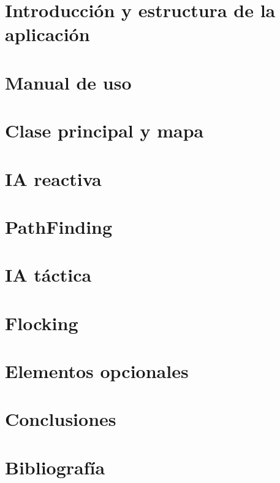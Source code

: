 \documentclass[a4paper,10pt]{article}
\begin{document}
\newpage
\part{Introducción y estructura de la aplicación}





\newpage
\part{Manual de uso}



\newpage
\part{Clase principal y mapa}





\newpage
\part{IA reactiva}









\newpage
\part{PathFinding}



\newpage
\part{IA táctica}















\newpage
\part{Flocking}




\newpage
\part{Elementos opcionales}




\newpage
\part{Conclusiones}



\newpage
\part{Bibliografía}

\end{document}
